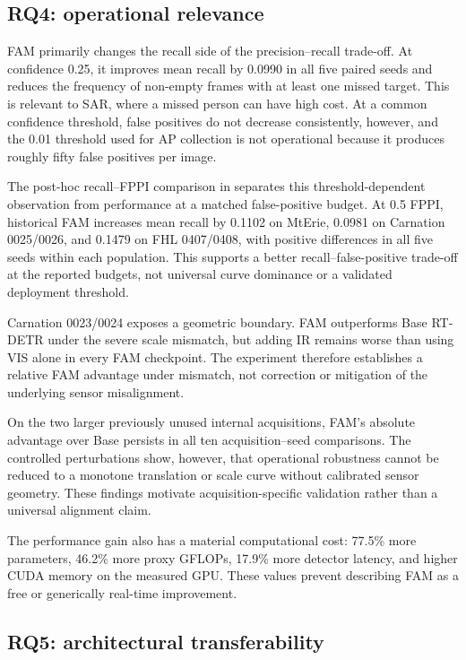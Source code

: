 \subsection{RQ4: operational relevance}

FAM primarily changes the recall side of the precision--recall trade-off. At
confidence 0.25, it improves mean recall by 0.0990 in all five paired seeds and
reduces the frequency of non-empty frames with at least one missed target. This
is relevant to SAR, where a missed person can have high cost. At a common
confidence threshold, false positives do not decrease consistently, however,
and the 0.01 threshold used for AP collection is not operational because it
produces roughly fifty false positives per image.

The post-hoc recall--FPPI comparison in  separates this
threshold-dependent observation from performance at a matched false-positive
budget. At 0.5 FPPI, historical FAM increases mean recall by 0.1102 on MtErie,
0.0981 on Carnation 0025/0026, and 0.1479 on FHL 0407/0408, with positive
differences in all five seeds within each population. This supports a better
recall--false-positive trade-off at the reported budgets, not universal
curve dominance or a validated deployment threshold.

Carnation 0023/0024 exposes a geometric boundary. FAM outperforms Base RT-DETR under the
severe scale mismatch, but adding IR remains worse than using VIS alone in
every FAM checkpoint. The experiment therefore establishes a relative FAM
advantage under mismatch, not correction or mitigation of the underlying
sensor misalignment.

On the two larger previously unused internal acquisitions, FAM's absolute
advantage over Base persists in all ten acquisition--seed comparisons.
The controlled perturbations show, however, that operational robustness cannot
be reduced to a monotone translation or scale curve without calibrated sensor
geometry. These findings motivate acquisition-specific validation rather than
a universal alignment claim.

The performance gain also has a material computational cost: 77.5\% more
parameters, 46.2\% more proxy GFLOPs, 17.9\% more detector latency, and higher
CUDA memory on the measured GPU. These values prevent describing FAM as a free
or generically real-time improvement.

\subsection{RQ5: architectural transferability}

